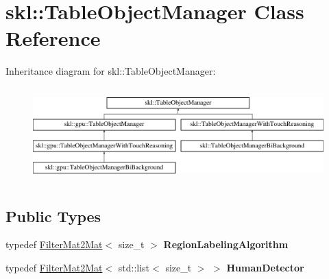 \hypertarget{classskl_1_1_table_object_manager}{}\section{skl\+:\+:Table\+Object\+Manager Class Reference}
\label{classskl_1_1_table_object_manager}
Inheritance diagram for skl\+:\+:Table\+Object\+Manager\+:\begin{figure}[H]
\begin{center}
\leavevmode
\includegraphics[height=3.672131cm]{classskl_1_1_table_object_manager}
\end{center}
\end{figure}
\subsection*{Public Types}
\begin{DoxyCompactItemize}
\item 
\hypertarget{classskl_1_1_table_object_manager_a422d00c4412bfcaa566575392bf74a34}{}\label{classskl_1_1_table_object_manager_a422d00c4412bfcaa566575392bf74a34} 
typedef \hyperlink{classskl_1_1_filter_mat2_mat}{Filter\+Mat2\+Mat}$<$ size\+\_\+t $>$ {\bfseries Region\+Labeling\+Algorithm}
\item 
\hypertarget{classskl_1_1_table_object_manager_a67feba55350b7494b2fdd7c85542df26}{}\label{classskl_1_1_table_object_manager_a67feba55350b7494b2fdd7c85542df26} 
typedef \hyperlink{classskl_1_1_filter_mat2_mat}{Filter\+Mat2\+Mat}$<$ std\+::list$<$ size\+\_\+t $>$ $>$ {\bfseries Human\+Detector}
\end{DoxyCompactItemize}

